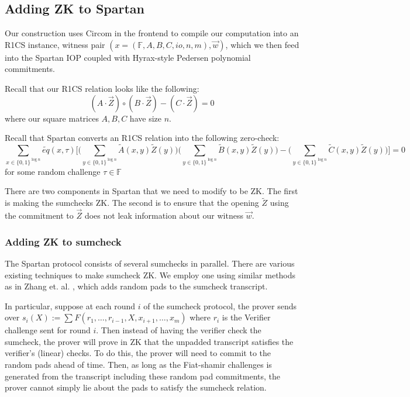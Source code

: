 \subsection{Adding ZK to Spartan}

Our construction uses Circom in the frontend to compile our computation into an R1CS instance, witness pair $(x=(\mathbb{F}, A, B, C, io, n, m), \vec{w})$, 
which we then feed into the Spartan IOP coupled with Hyrax-style Pedersen polynomial commitments.

Recall that our R1CS relation looks like the following:
$$
(A \cdot \vec{Z}) \circ (B \cdot \vec{Z}) - (C \cdot \vec{Z}) = 0
$$
where our square matrices $A, B, C$ have size $n$.

Recall that Spartan converts an R1CS relation into the following zero-check:
$$
\sum_{x \in \{0,1\}^{\log n}} \widetilde{eq}(x, \tau) 
\bigg[\bigg(\sum_{y \in \{0,1\}^{\log n}} \widetilde{A}(x,y) \widetilde{Z}(y)\bigg)
\bigg(\sum_{y \in \{0,1\}^{\log n}} \widetilde{B}(x,y) \widetilde{Z}(y)\bigg)
- \bigg(\sum_{y \in \{0,1\}^{\log n}} \widetilde{C}(x,y) \widetilde{Z}(y)\bigg)\bigg] = 0
$$
for some random challenge $\tau \in \mathbb{F}$

There are two components in Spartan that we need to modify to be ZK. 
The first is making the sumchecks ZK. 
The second is to ensure that the opening $\widetilde{Z}$ using the commitment to $\vec{Z}$ does not leak information about our witness $\vec{w}$.

\subsubsection{Adding ZK to sumcheck}

The Spartan protocol consists of several sumchecks in parallel. There are various existing techniques to make sumcheck ZK. 
We employ one using similar methods as in Zhang et. al. \cite{cryptoeprint:2019/1482}, which adds random pads to the sumcheck transcript.

In particular, suppose at each round $i$ of the sumcheck protocol, the prover sends over $s_i(X) := \sum_{} F(r_1, \dots, r_{i-1}, X, x_{i+1}, \dots, x_m)$ 
where $r_i$ is the Verifier challenge sent for round $i$. Then instead of having the verifier check the sumcheck, the prover will prove in ZK that the unpadded transcript satisfies the verifier's (linear) checks.
To do this, the prover will need to commit to the random pads ahead of time. 
Then, as long as the Fiat-shamir challenges is generated from the transcript including these random pad commitments, the prover cannot simply lie about the pads to satisfy the sumcheck relation.

